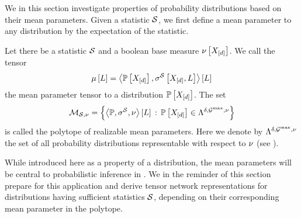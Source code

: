 
We in this section investigate properties of probability distributions based on their mean parameters.
Given a statistic $\mathcal{S}$, we first define a mean parameter to any distribution by the expectation of the statistic.

\begin{definition}
    \label{def:meanPolytope}
    Let there be a statistic $\mathcal{S}$ and a boolean base measure $\nu\left[X_{[d]}\right]$.
    We call the tensor
    \begin{align*}
        \mu\left[L\right]
        = \left\langle \mathbb{P}\left[X_{[d]}\right],\sigma^{\mathcal{S}}\left[X_{[d]},L\right]\right\rangle \left[ L \right]
    \end{align*}
    the mean parameter tensor to a distribution $\mathbb{P}\left[X_{[d]}\right]$.
    The set
    \begin{align*}
        \mathcal{M}_{\mathcal{S},\nu}
        = \left\{\left\langle \mathbb{P},\sigma^{\mathcal{S}},\nu\right\rangle \left[ L \right]\,:\,\mathbb{P}\left[X_{[d]}\right]\in\Lambda^{\delta,\mathcal{G}^{\mathrm{max}},\nu} \right\}
    \end{align*}
    is called the polytope of realizable mean parameters.
    Here we denote by $\Lambda^{\delta,\mathcal{G}^{\mathrm{max}},\nu}$ the set of all probability distributions representable with respect to $\nu$ (see ).
\end{definition}

While introduced here as a property of a distribution, the mean parameters will be central to probabilistic inference in .
We in the reminder of this section prepare for this application and derive tensor network representations for distributions having sufficient statistics $\mathcal{S}$, depending on their corresponding mean parameter in the polytope.




